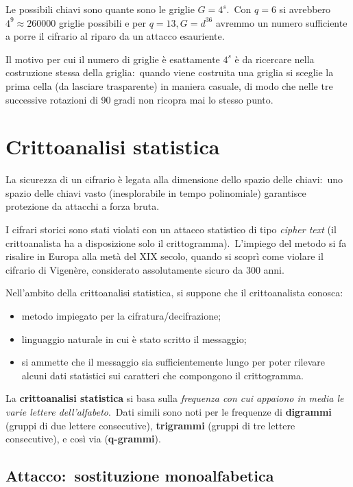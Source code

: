 \noindent Le possibili chiavi sono quante sono le griglie $G= 4^s$.\
Con $q = 6$ si avrebbero $4^9 \approx 260000$ griglie possibili e per $q=13, G=d^{36}$ avremmo un numero sufficiente a porre il cifrario al riparo da un attacco esauriente.\

Il motivo per cui il numero di griglie è esattamente $4^s$ è da ricercare nella costruzione stessa della griglia:\ quando viene costruita una griglia si sceglie la prima cella (da lasciare trasparente) in maniera casuale, di modo che nelle tre successive rotazioni di 90 gradi non ricopra mai lo stesso punto.\

\section{Crittoanalisi statistica}

La sicurezza di un cifrario è legata alla dimensione dello spazio delle chiavi:\ uno spazio delle chiavi vasto (inesplorabile in tempo polinomiale) garantisce protezione da attacchi a forza bruta.\

I cifrari storici sono stati violati con un attacco statistico di tipo \textit{cipher text} (il crittoanalista ha a disposizione solo il crittogramma).\
L'impiego del metodo si fa risalire in Europa alla metà del XIX secolo, quando si scoprì come violare il cifrario di Vigenère, considerato assolutamente sicuro da 300 anni.\

Nell'ambito della crittoanalisi statistica, si suppone che il crittoanalista conosca:\

\begin{itemize}
    \item metodo impiegato per la cifratura/decifrazione;
    \item linguaggio naturale in cui è stato scritto il messaggio;
    \item si ammette che il messaggio sia sufficientemente lungo per poter rilevare alcuni dati statistici sui caratteri che compongono il crittogramma.\
\end{itemize}

\noindent La \textbf{crittoanalisi statistica} si basa sulla \textit{frequenza con cui appaiono in media le varie lettere dell'alfabeto}.\
Dati simili sono noti per le frequenze di \textbf{digrammi} (gruppi di due lettere consecutive), \textbf{trigrammi} (gruppi di tre lettere consecutive), e così via (\textbf{q-grammi}).\

\subsection{Attacco:\ sostituzione monoalfabetica}

